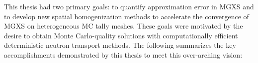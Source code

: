 This thesis had two primary goals: to quantify approximation error in MGXS and to develop new spatial homogenization methods to accelerate the convergence of MGXS on heterogeneous MC tally meshes. These goals were motivated by the desire to obtain Monte Carlo-quality solutions with computationally efficient deterministic neutron transport methods. The following summarizes the key accomplishments demonstrated by this thesis to meet this over-arching vision:



